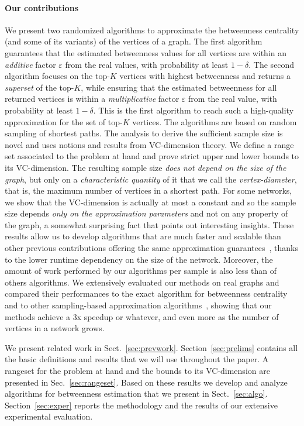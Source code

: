 \paragraph{Our contributions} 
We present two randomized algorithms to approximate the betweenness centrality
(and some of its variants) of the vertices of a graph. The first algorithm
guarantees that the estimated betweenness values for all vertices are within an
\emph{additive} factor $\varepsilon$ from the real values, with probability at
least $1-\delta$. The second algorithm focuses on the top-$K$ vertices with
highest betweenness and returns a \emph{superset} of the top-$K$,
while ensuring that the estimated betweenness for all returned vertices is
within a \emph{multiplicative} factor $\varepsilon$ from the real value, with
probability at least $1-\delta$. This is the first algorithm to reach such a
high-quality approximation for the set of top-$K$ vertices. The algorithms are
based on random sampling of shortest paths. The analysis to derive the
sufficient sample size is novel and uses notions and results from VC-dimension
theory. We define a range set associated to the problem at hand and prove strict
upper and lower bounds to its VC-dimension. The resulting sample size \emph{does not
depend on the size of the graph}, but only on a \emph{characteristic quantity} of it
that we call the \emph{vertex-diameter}, that is, the maximum number of vertices
in a shortest path. For some networks, we show that the VC-dimension is actually
at most a constant and so the sample size depends \emph{only on the approximation
parameters} and not on any property of the graph, a somewhat surprising fact
that points out interesting insights. These results allow us to develop
algorithms that are much faster and scalable than other previous contributions
offering the same approximation
guarantees~\citep{JacobKLPT05,BrandesP07,GeisbergerSS08}, thanks to the lower
runtime dependency on the size of the network. Moreover, the amount of work
performed by our algorithms per sample is also less than of others algorithms.
We extensively evaluated our methods on real graphs and compared their
performances to the exact algorithm for betweenness centrality~\citep{Brandes01}
and to other sampling-based approximation
algorithms~\citep{JacobKLPT05,BrandesP07,GeisbergerSS08}, showing that our
methods achieve a 3x speedup \XXX or whatever, and even more as the number of
vertices in a network grows.

We present related work in Sect.~\ref{sec:prevwork}. Section~\ref{sec:prelims}
contains all the basic definitions and results that we will use throughout the
paper. A rangeset for the problem at hand and the bounds to its VC-dimension
are presented in Sec.~\ref{sec:rangeset}. Based on these results we develop and
analyze algorithms for betweenness estimation that we present in
Sect.~\ref{sec:algo}. Section~\ref{sec:exper} reports the methodology and
the results of our extensive experimental evaluation.

